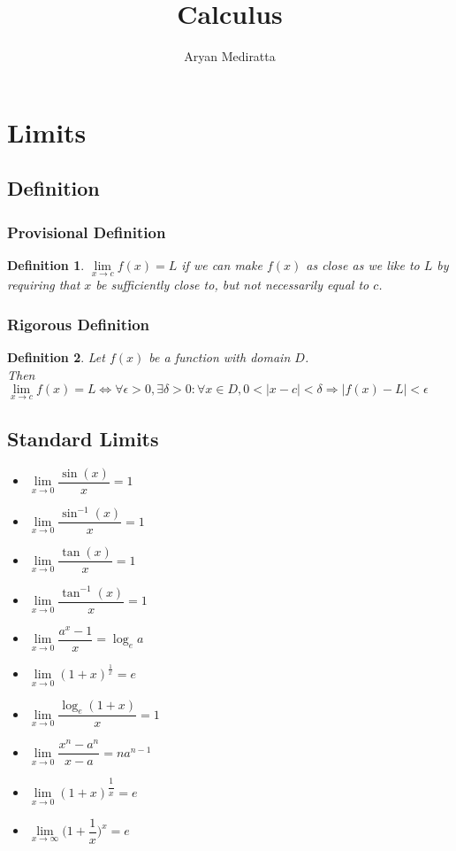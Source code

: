 \documentclass[14]{article}
\newtheorem{define}{Definition}
\begin{document}
\title{Calculus}
\author{Aryan Mediratta}
\maketitle
\tableofcontents
\pagebreak
\section{Limits}
\subsection{Definition}
\subsubsection{Provisional Definition}
\begin{define}
$\lim\limits_{x \to c} f(x) = L$ if we can make $f(x)$ as close as we like to $L$ by requiring that $x$ be sufficiently close to, but not necessarily equal to $c$.
\end{define}
\subsubsection{Rigorous Definition}
\begin{define}
Let $f(x)$ be a function with domain $D$.\\
Then $\lim\limits_{x \to c} f(x) = L \Leftrightarrow \forall \epsilon > 0, \exists \delta > 0:\forall x \in D, 0 < |x-c| < \delta \Rightarrow |f(x)-L| < \epsilon$
\end{define}
\subsection{Standard Limits}
\begin{itemize}
\item $\lim\limits_{x \to 0} \dfrac{\sin(x)}{x} = 1$
\item $\lim\limits_{x \to 0} \dfrac{\sin^{-1}(x)}{x} = 1$
\item $\lim\limits_{x \to 0} \dfrac{\tan(x)}{x} = 1$
\item $\lim\limits_{x \to 0} \dfrac{\tan^{-1}(x)}{x} = 1$
\item $\lim\limits_{x \to 0} \dfrac{a^x - 1}{x} = \log_e{a}$
\item $\lim\limits_{x \to 0} (1+x)^{\frac{1}{x}} = e$
\item $\lim\limits_{x \to 0} \dfrac{\log_e{(1+x)}}{x} = 1$
\item $\lim\limits_{x \to 0} \dfrac{x^n - a^n}{x-a} = na^{n-1}$
\item $\lim\limits_{x \to 0} (1+x)^{\dfrac{1}{x}} = e$
\item $\lim\limits_{x \to \infty} \Big(1 + \dfrac{1}{x}\Big)^x = e$
\end{itemize}
\end{document}
